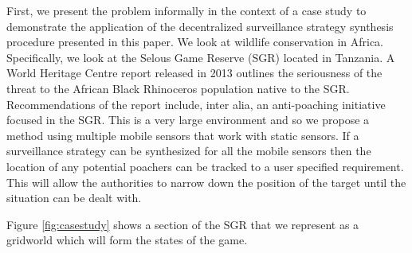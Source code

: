 First, we present the problem informally in the context of a case study to demonstrate the application of the decentralized surveillance strategy synthesis procedure presented in this paper. We look at wildlife conservation in Africa. Specifically, we look at the Selous Game Reserve (SGR) located in Tanzania. A World Heritage Centre report released in 2013 \cite{UN13} outlines the seriousness of the threat to the African Black Rhinoceros population native to the SGR. Recommendations of the report include, inter alia, an anti-poaching initiative focused in the SGR. This is a very large environment and so we propose a method using multiple mobile sensors that work with static sensors.  If a surveillance strategy can be synthesized for all the mobile sensors then the location of any potential poachers can be tracked to a user specified requirement. This will allow the authorities to narrow down the position of the target until the situation can be dealt with. 

Figure \ref{fig:casestudy} shows a section of the SGR that we represent as a gridworld which will form the states of the game. 


